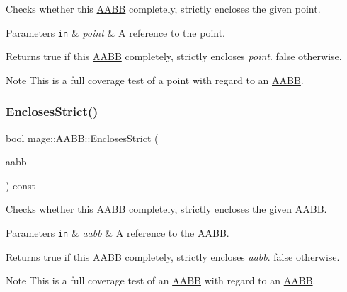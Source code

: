 Checks whether this \hyperlink{classmage_1_1_a_a_b_b}{A\+A\+BB} completely, strictly encloses the given point.


\begin{DoxyParams}[1]{Parameters}
\mbox{\tt in}  & {\em point} & A reference to the point. \\
\hline
\end{DoxyParams}
\begin{DoxyReturn}{Returns}
{\ttfamily true} if this \hyperlink{classmage_1_1_a_a_b_b}{A\+A\+BB} completely, strictly encloses {\itshape point}. {\ttfamily false} otherwise. 
\end{DoxyReturn}
\begin{DoxyNote}{Note}
This is a full coverage test of a point with regard to an \hyperlink{classmage_1_1_a_a_b_b}{A\+A\+BB}. 
\end{DoxyNote}
\hypertarget{classmage_1_1_a_a_b_b_af037df0800e1e8c3564363f154c2424a}{}\label{classmage_1_1_a_a_b_b_af037df0800e1e8c3564363f154c2424a} 
\subsubsection{\texorpdfstring{Encloses\+Strict()}{EnclosesStrict()}\hspace{0.1cm}{\footnotesize\ttfamily [3/4]}}
{\footnotesize\ttfamily bool mage\+::\+A\+A\+B\+B\+::\+Encloses\+Strict (\begin{DoxyParamCaption}\item[{const \hyperlink{classmage_1_1_a_a_b_b}{A\+A\+BB} \&}]{aabb }\end{DoxyParamCaption}) const\hspace{0.3cm}{\ttfamily [noexcept]}}

Checks whether this \hyperlink{classmage_1_1_a_a_b_b}{A\+A\+BB} completely, strictly encloses the given \hyperlink{classmage_1_1_a_a_b_b}{A\+A\+BB}.


\begin{DoxyParams}[1]{Parameters}
\mbox{\tt in}  & {\em aabb} & A reference to the \hyperlink{classmage_1_1_a_a_b_b}{A\+A\+BB}. \\
\hline
\end{DoxyParams}
\begin{DoxyReturn}{Returns}
{\ttfamily true} if this \hyperlink{classmage_1_1_a_a_b_b}{A\+A\+BB} completely, strictly encloses {\itshape aabb}. {\ttfamily false} otherwise. 
\end{DoxyReturn}
\begin{DoxyNote}{Note}
This is a full coverage test of an \hyperlink{classmage_1_1_a_a_b_b}{A\+A\+BB} with regard to an \hyperlink{classmage_1_1_a_a_b_b}{A\+A\+BB}. 
\end{DoxyNote}
\hypertarget{classmage_1_1_a_a_b_b_a463390d29cc113880fc259d1db8b1eda}{}\label{classmage_1_1_a_a_b_b_a463390d29cc113880fc259d1db8b1eda} 

